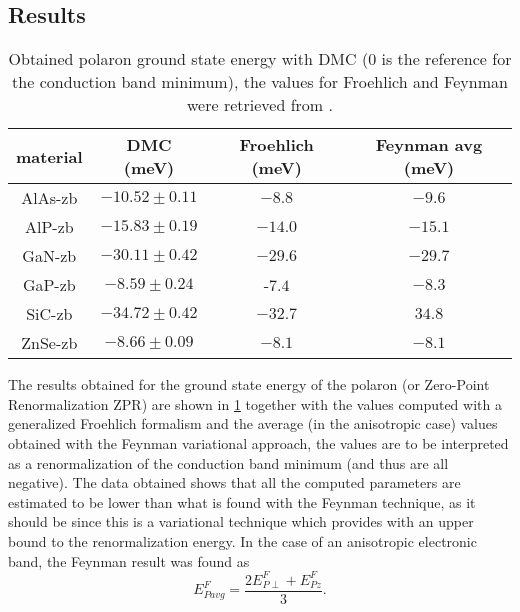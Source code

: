 \subsection{Results}
\begin{table}[H]
    \centering
    \begin{tabular}{|c|c|c|c|}
        \hline
        \hline
        material & DMC (meV) & Froehlich (meV) & Feynman avg (meV)\\
        \hline
        \hline
        AlAs-zb & $-10.52\pm0.11$ & $-8.8$ & $-9.6$ \\
        AlP-zb & $-15.83\pm0.19$ &  $-14.0$ & $-15.1$ \\
        GaN-zb & $-30.11\pm0.42$ & $-29.6$ & $-29.7$ \\
        GaP-zb & $-8.59\pm0.24$ & -$7.4$ & $-8.3$ \\ 
        SiC-zb & $-34.72\pm0.42$ & $-32.7$ & $34.8$ \\
        ZnSe-zb & $-8.66\pm0.09$ & $-8.1$ & $-8.1$ \\
        \hline
    \end{tabular}
    \caption{Obtained polaron ground state energy with DMC ($0$ is the reference for the conduction band minimum), the values for Froehlich and Feynman were retrieved from \cite{guster2021frohlich}.}
    \label{tab:gs_obtained}
\end{table}
The results obtained for the ground state energy of the polaron (or Zero-Point Renormalization ZPR) are shown in \ref{tab:gs_obtained} together with the values computed with 
a generalized Froehlich formalism and the average (in the anisotropic case) values obtained with the Feynman variational approach, the values are to be interpreted as 
a renormalization of the conduction band minimum (and thus are all negative). The data obtained shows that all the computed parameters are estimated to be lower than 
what is found with the Feynman technique, as it should be since this is a variational technique which provides with an upper bound to the renormalization energy. In the case of an anisotropic electronic band, 
the Feynman result was found as 
\begin{equation}
    E^F_{Pavg}=\frac{2E^F_{P\perp}+E^F_{Pz}}{3}.
\end{equation}
